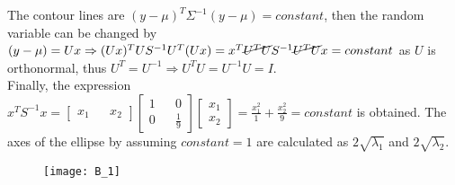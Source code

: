 The contour lines are \((y-\mu)^T\Sigma^{-1}(y-\mu) = constant\), then
the random variable can be changed by
\((y-\mu)=Ux \Rightarrow (Ux)^TUS^{-1}U^T(Ux)=x^T\cancel{U^TU}S^{-1}\cancel{U^TU}x=constant\)
as \(U\) is orthonormal, thus \(U^T = U^{-1} \Rightarrow U^TU=U^{-1}U=I\).\\
Finally, the expression
\(x^TS^{-1}x=
\begin{bmatrix}
    x_1 && x_2
\end{bmatrix}
\begin{bmatrix}
    1 && 0 \\ 0 && \frac{1}{9}
\end{bmatrix}
\begin{bmatrix}
    x_1 \\ x_2
\end{bmatrix}
=
\frac{x_1^2}{1}+\frac{x_2^2}{9}
=
constant
\)
is obtained.
The axes of the ellipse by assuming \(constant=1\) are calculated as
\(2\sqrt{\lambda_1}\) and \(2\sqrt{\lambda_2}\).
\begin{figure}[H]
    \texttt{[image: B\_1]}
    \centering
\end{figure}